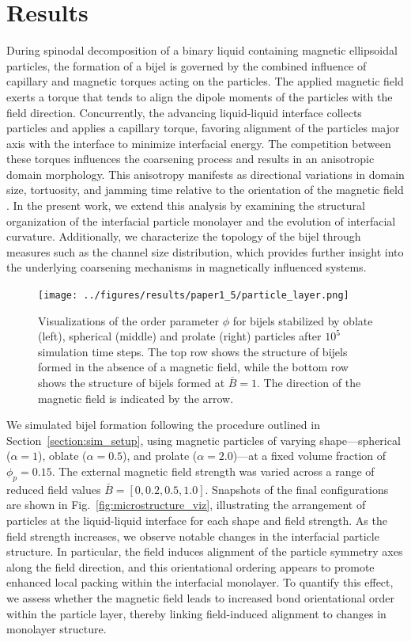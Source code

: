 \section{Results}

During spinodal decomposition of a binary liquid containing magnetic ellipsoidal particles, the formation of a bijel is governed by the combined influence of capillary and magnetic torques acting on 
the particles. The applied magnetic field exerts a torque that tends to align the dipole moments of the particles with the field direction. Concurrently, the advancing liquid-liquid interface collects 
particles and applies a capillary torque, favoring alignment of the particles major axis with the interface to minimize interfacial energy. The competition between these torques influences the 
coarsening process and results in an anisotropic domain morphology. This anisotropy manifests as directional variations in domain size, tortuosity, and jamming time relative to the orientation of 
the magnetic field \cite{karthikeyan_formation_2024}. In the present work, we extend this analysis by examining the structural organization of the interfacial particle monolayer and the evolution 
of interfacial curvature. Additionally, we characterize the topology of the bijel through measures such as the channel size distribution, which provides further insight into the underlying coarsening 
mechanisms in magnetically influenced systems.

\begin{figure}
\centering
\texttt{[image: ../figures/results/paper1\_5/particle\_layer.png]}%
\caption{Visualizations of the order parameter $\phi$ for bijels stabilized by oblate (left), spherical (middle) and prolate (right) particles 
         after $10^5$ simulation time steps. The top row shows the structure of bijels formed in the 
         absence of a magnetic field, while the bottom row shows the structure of bijels formed at $\bar{B} = 1$. 
         The direction of the magnetic field is indicated by the arrow.
\label{fig:particle_layer}}%
\end{figure}

We simulated bijel formation following the procedure outlined in Section~\ref{section:sim_setup}, using magnetic particles of varying shape—spherical (\(\alpha = 1\)), oblate (\(\alpha = 0.5\)), 
and prolate (\(\alpha = 2.0\))—at a fixed volume fraction of \(\phi_p = 0.15\). The external magnetic field strength was varied across a range of reduced field values \(\bar{B} = [0, 0.2, 0.5, 1.0]\). 
Snapshots of the final configurations are shown in Fig.~\ref{fig:microstructure_viz}, illustrating the arrangement of particles at the liquid-liquid interface for each shape and field strength. As the 
field strength increases, we observe notable changes in the interfacial particle structure. In particular, the field induces alignment of the particle symmetry axes along the field direction, and this 
orientational ordering appears to promote enhanced local packing within the interfacial monolayer. To quantify this effect, we assess whether the magnetic field leads to increased bond orientational 
order within the particle layer, thereby linking field-induced alignment to changes in monolayer structure.

